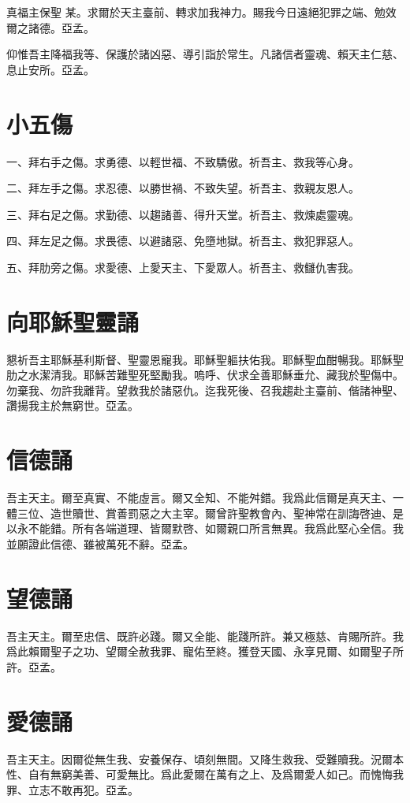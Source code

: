 真福主保聖 {\small\raisebox{-0.2zh}{人}\raisebox{0.2zh}{女} 某}。求爾於天主臺前、轉求加我神力。賜我今日遠絕犯罪之端、勉效爾之諸德。{\cspace}亞孟。

仰惟吾主降福我等、保護於諸凶惡、導引詣於常生。凡諸信者靈魂、賴天主仁慈、息止安所。{\cspace}亞孟。

\section*{小五傷}
\noindent 一、拜右手之傷。求勇德、以輕世福、不致驕傲。祈吾主、救我等心身。

\noindent 二、拜左手之傷。求忍德、以勝世禍、不致失望。祈吾主、救親友恩人。

\noindent 三、拜右足之傷。求勤德、以趨諸善、得升天堂。祈吾主、救煉處靈魂。

\noindent 四、拜左足之傷。求畏德、以避諸惡、免墮地獄。祈吾主、救犯罪惡人。

\noindent 五、拜肋旁之傷。求愛德、上愛天主、下愛眾人。祈吾主、救讎仇害我。

\section*{向耶穌聖靈誦}
懇祈吾主耶穌基利斯督、聖靈恩寵我。耶穌聖軀扶佑我。耶穌聖血酣暢我。耶穌聖肋之水潔清我。耶穌苦難聖死堅勵我。嗚呼、伏求全善耶穌垂允、藏我於聖傷中。勿棄我、勿許我離背。望救我於諸惡仇。迄我死後、召我趨赴主臺前、偕諸神聖、讚揚我主於無窮世。{\cspace}亞孟。

\section*{信德誦}
吾主天主。爾至真實、不能虛言。爾又全知、不能舛錯。我爲此信爾是真天主、一體三位、造世贖世、賞善罰惡之大主宰。爾曾許聖教會內、聖神常在訓誨啓迪、是以永不能錯。所有各端道理、皆爾默啓、如爾親口所言無異。我爲此堅心全信。我並願證此信德、雖被萬死不辭。{\cspace}亞孟。

\section*{望德誦}
吾主天主。爾至忠信、既許必踐。爾又全能、能踐所許。兼又極慈、肯賜所許。我爲此賴爾聖子之功、望爾全赦我罪、寵佑至終。獲登天國、永享見爾、如爾聖子所許。{\cspace}亞孟。

\section*{愛德誦}
吾主天主。因爾從無生我、安養保存、頃刻無間。又降生救我、受難贖我。況爾本性、自有無窮美善、可愛無比。爲此愛爾在萬有之上、及爲爾愛人如己。而愧悔我罪、立志不敢再犯。{\cspace}亞孟。

